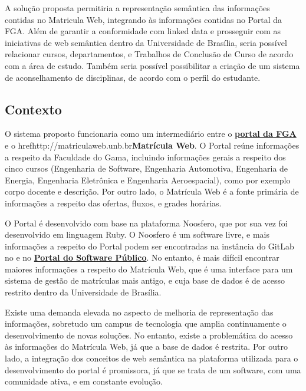 
A solução proposta permitiria a representação semântica das informações contidas no Matricula Web, integrando às informações contidas no Portal da FGA. Além de garantir a conformidade com linked data e prosseguir com as iniciativas de web semântica dentro da Universidade de Brasília, seria possível relacionar cursos, departamentos, e Trabalhos de Conclusão de Curso de acordo com a área de estudo. Também seria possível possibilitar a criação de um sistema de aconselhamento de disciplinas, de acordo com o perfil do estudante.

\subsection{Contexto} %
\label{sub:contexto}

O sistema proposto funcionaria como um intermediário entre o \href{https://fga.unb.br/}{\textbf{portal da FGA}} e o href{http://matriculaweb.unb.br}{\textbf{Matrícula Web}}. O Portal reúne informações a respeito da Faculdade do Gama, incluindo informações gerais a respeito dos cinco cursos (Engenharia de Software, Engenharia Automotiva, Engenharia de Energia, Engenharia Eletrônica e Engenharia Aeroespacial), como por exemplo corpo docente e descrição. Por outro lado, o Matrícula Web é a fonte primária de informações a respeito das ofertas, fluxos, e grades horárias. 

O Portal é desenvolvido com base na plataforma Noosfero, que por sua vez foi desenvolvido em linguagem Ruby. O Noosfero é um software livre, e mais informações a respeito do Portal podem ser encontradas na instância do GitLab no e no \href{https://softwarepublico.gov.br/}{\textbf{Portal do Software Público}}. No entanto, é mais difícil encontrar maiores informações a respeito do Matrícula Web, que é uma interface para um sistema de gestão de matrículas mais antigo, e cuja base de dados é de acesso restrito dentro da Universidade de Brasília.

Existe uma demanda elevada no aspecto de melhoria de representação das informações, sobretudo um campus de tecnologia que amplia continuamente o desenvolvimento de novas soluções. No entanto, existe a problemática do acesso às informações do Matrícula Web, já que a base de dados é restrita. Por outro lado, a integração dos conceitos de web semântica na plataforma utilizada para o desenvolvimento do portal é promissora, já que se trata de um software, com uma comunidade ativa, e em constante evolução.
